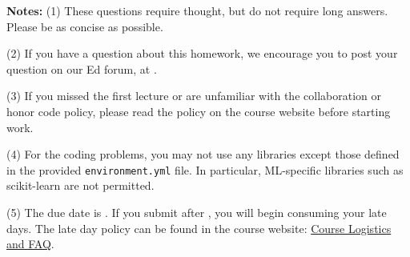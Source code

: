 {\bf Notes:} 
(1) These questions require thought, but do not require long
answers. Please be as concise as possible.  

(2) If you have a question
about this homework, we encourage you to post your question on our
Ed forum, at \edstem. 

(3) If you
missed the first lecture or are unfamiliar with the collaboration or honor
code policy, please read the policy on the course website before starting work.

(4) For the coding problems, you may not
use any libraries except those defined in the provided \texttt{environment.yml}
file. In particular, ML-specific libraries such as scikit-learn are not
permitted. 

(5) The due date is \due. If you submit after
\due, you will begin consuming your
late days. The late day policy can be found in the course website:  \href{https://docs.google.com/document/d/1abIV2lyPfWN--K8kCLqrYIJ7jh4DHeh6o7bVR3YMvJo/edit?usp=sharing}{Course Logistics and FAQ}.

